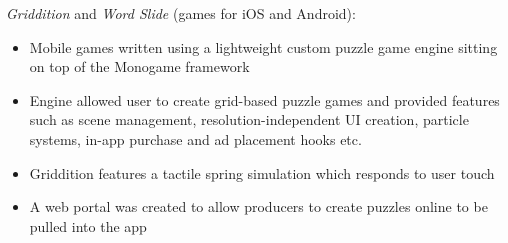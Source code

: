 \item \emph{Griddition} and \emph{Word Slide} (games for iOS and Android):
\begin{itemize}%
    \item Mobile games written using a lightweight custom puzzle game engine sitting on top of the Monogame framework
    \item Engine allowed user to create grid-based puzzle games and provided features such as scene management, resolution-independent UI creation, particle systems, in-app purchase and ad placement hooks etc.
    \item Griddition features a tactile spring simulation which responds to user touch
    \item A web portal was created to allow producers to create puzzles online to be pulled into the app
\end{itemize}
